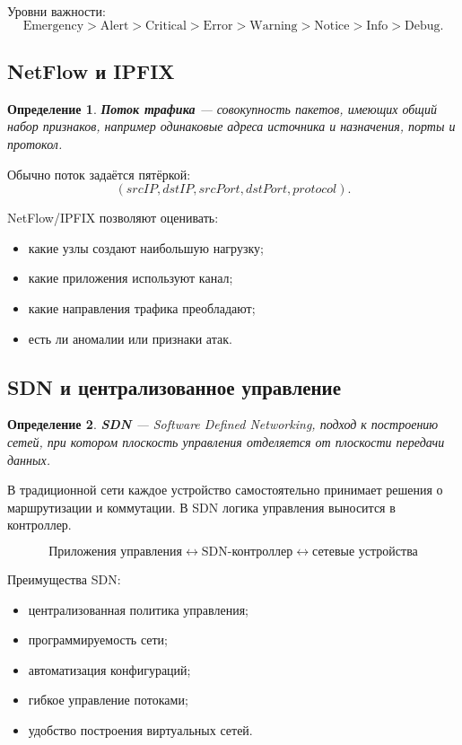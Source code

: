 \documentclass[12pt,a4paper]{article}
\newtheorem{definition}{Определение}
\begin{document}
Уровни важности:
\[
\text{Emergency} > \text{Alert} > \text{Critical} > \text{Error} > \text{Warning} > \text{Notice} > \text{Info} > \text{Debug}.
\]

\subsection{NetFlow и IPFIX}

\begin{definition}
\textbf{Поток трафика} --- совокупность пакетов, имеющих общий набор признаков, например одинаковые адреса источника и назначения, порты и протокол.
\end{definition}

Обычно поток задаётся пятёркой:
\[
(srcIP, dstIP, srcPort, dstPort, protocol).
\]

NetFlow/IPFIX позволяют оценивать:
\begin{itemize}
    \item какие узлы создают наибольшую нагрузку;
    \item какие приложения используют канал;
    \item какие направления трафика преобладают;
    \item есть ли аномалии или признаки атак.
\end{itemize}

\subsection{SDN и централизованное управление}

\begin{definition}
\textbf{SDN} --- Software Defined Networking, подход к построению сетей, при котором плоскость управления отделяется от плоскости передачи данных.
\end{definition}

В традиционной сети каждое устройство самостоятельно принимает решения о маршрутизации и коммутации. В SDN логика управления выносится в контроллер.

\[
\text{Приложения управления}
\longleftrightarrow
\text{SDN-контроллер}
\longleftrightarrow
\text{сетевые устройства}
\]

Преимущества SDN:
\begin{itemize}
    \item централизованная политика управления;
    \item программируемость сети;
    \item автоматизация конфигураций;
    \item гибкое управление потоками;
    \item удобство построения виртуальных сетей.
\end{itemize}
\end{document}
